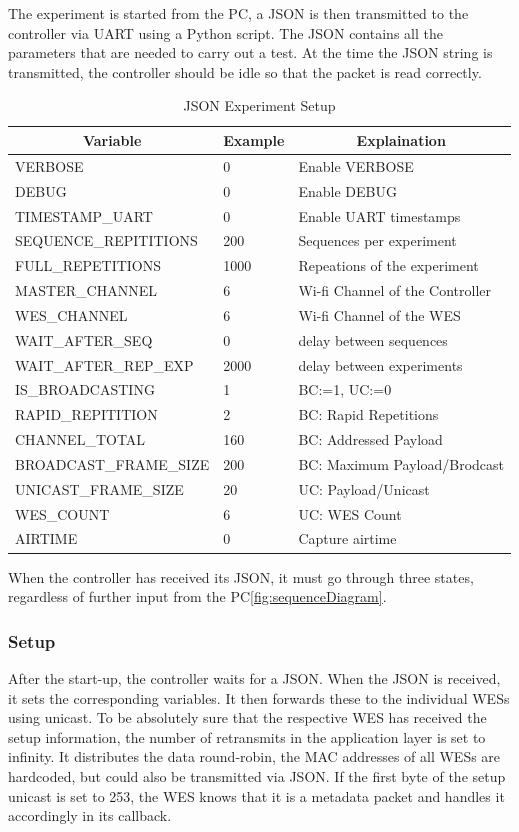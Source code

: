 The experiment is started from the PC, a JSON is then transmitted to the controller via \ac{UART} using a Python script.
The JSON contains all the parameters that are needed to carry out a test.
At the time the JSON string is transmitted, the controller should be idle so that the packet is read correctly.

\begin{table}[h]
	\centering
	\begin{tabular} { lll }
	\toprule
	\multicolumn{1}{c}{Variable}
	& \multicolumn{1}{c}{Example}
	& \multicolumn{1}{c}{Explaination} \\
	\midrule
	VERBOSE               & 0 				& Enable VERBOSE \\
	DEBUG                 & 0 				& Enable DEBUG \\
	TIMESTAMP\_UART       & 0				& Enable UART timestamps \\
	SEQUENCE\_REPITITIONS & 200				& Sequences per experiment \\
	FULL\_REPETITIONS     & 1000			& Repeations of the experiment \\
	MASTER\_CHANNEL       & 6				& Wi-fi Channel of the Controller \\
	WES\_CHANNEL          & 6				& Wi-fi Channel of the WES \\
	WAIT\_AFTER\_SEQ      & 0				& delay between sequences \\
	WAIT\_AFTER\_REP\_EXP & 2000			& delay between experiments \\
	IS\_BROADCASTING      & 1				& BC:=1, UC:=0 \\
	RAPID\_REPITITION     & 2				& BC: Rapid Repetitions \\
	CHANNEL\_TOTAL        & 160	 			& BC: Addressed Payload \\
	BROADCAST\_FRAME\_SIZE& 200 			& BC: Maximum Payload/Brodcast \\
	UNICAST\_FRAME\_SIZE  & 20				& UC: Payload/Unicast \\
	WES\_COUNT            & 6				& UC: WES Count \\
	AIRTIME               & 0				& Capture airtime\\
	\bottomrule
	\end{tabular}
	\caption{JSON Experiment Setup}
	\label{tab:json}
\end{table}

When the controller has received its JSON, it must go through three states, regardless of further input from the PC\cref{fig:sequenceDiagram}.
\subsubsection*{Setup}
After the start-up, the controller waits for a JSON. When the JSON is received, it sets the corresponding variables.
It then forwards these to the individual WESs using unicast. 
To be absolutely sure that the respective WES has received the setup information,
the number of retransmits in the application layer is set to infinity.
It distributes the data round-robin, the MAC addresses of all WESs are hardcoded, but could also be transmitted via JSON.
If the first byte of the setup unicast is set to 253, the WES knows that it is a metadata packet and handles it accordingly in its callback.
